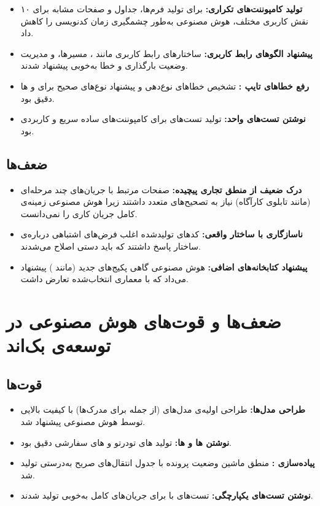 \documentclass[12pt]{article} %
\theoremstyle{definition}
\begin{document}
\begin{itemize}[rightmargin=1cm]
  \item \textbf{تولید کامپوننت‌های تکراری:}
    برای تولید فرم‌ها، جداول و صفحات مشابه برای ۱۰ نقش کاربری مختلف، هوش مصنوعی به‌طور چشمگیری زمان کدنویسی را کاهش داد.
  \item \textbf{پیشنهاد الگوهای رابط کاربری:}
    ساختارهای رابط کاربری مانند ،  مسیرها، و مدیریت وضعیت بارگذاری و خطا به‌خوبی پیشنهاد شدند.
  \item \textbf{رفع خطاهای تایپ :}
    تشخیص خطاهای نوع‌دهی و پیشنهاد نوع‌های صحیح برای  و ها دقیق بود.
  \item \textbf{نوشتن تست‌های واحد:}
    تولید تست‌های  برای کامپوننت‌های ساده سریع و کاربردی بود.
\end{itemize}

\subsection{ضعف‌ها}

\begin{itemize}[rightmargin=1cm]
  \item \textbf{درک ضعیف از منطق تجاری پیچیده:}
    صفحات مرتبط با جریان‌های چند مرحله‌ای (مانند تابلوی کارآگاه) نیاز به تصحیح‌های متعدد داشتند زیرا هوش مصنوعی زمینه‌ی کامل جریان کاری را نمی‌دانست.
  \item \textbf{ناسازگاری با ساختار  واقعی:}
    کدهای تولیدشده اغلب فرض‌های اشتباهی درباره‌ی ساختار پاسخ  داشتند که باید دستی اصلاح می‌شدند.
  \item \textbf{پیشنهاد کتابخانه‌های اضافی:}
    هوش مصنوعی گاهی پکیج‌های جدید (مانند ) پیشنهاد می‌داد که با معماری انتخاب‌شده تعارض داشت.
\end{itemize}

\section{ضعف‌ها و قوت‌های هوش مصنوعی در توسعه‌ی بک‌اند}

\subsection{قوت‌ها}

\begin{itemize}[rightmargin=1cm]
  \item \textbf{طراحی مدل‌ها:}
    طراحی اولیه‌ی مدل‌های  (از جمله  برای مدرک‌ها) با کیفیت بالایی توسط هوش مصنوعی پیشنهاد شد.
  \item \textbf{نوشتن ها و ها:}
    تولید های تودرتو و های سفارشی دقیق بود.
  \item \textbf{پیاده‌سازی :}
    منطق ماشین وضعیت پرونده با جدول انتقال‌های صریح به‌درستی تولید شد.
  \item \textbf{نوشتن تست‌های یکپارچگی:}
    تست‌های  با  برای جریان‌های کامل به‌خوبی تولید شدند.
\end{itemize}
\end{document}

